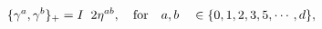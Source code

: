 \begin{equation}
\{\gamma^a, \gamma^b \}_+ = I \;\;2\eta^{ab}, \quad {\rm for} \quad a,b \quad \in \{0,1,2,3,5,\cdots,d \},
\label{clif}
\end{equation}

